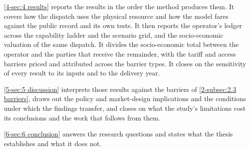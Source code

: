 \autoref{4-sec:4 results} reports the results in the order the method produces them. It covers how the dispatch uses the physical resource and how the model fares against the public record and its own tests. It then reports the operator's ledger across the capability ladder and the scenario grid, and the socio-economic valuation of the same dispatch. It divides the socio-economic total between the operator and the parties that receive the remainder, with the tariff and access barriers priced and attributed across the barrier types. It closes on the sensitivity of every result to its inputs and to the delivery year.

\autoref{5-sec:5 discussion} interprets those results against the barriers of \autoref{2-subsec:2.3 barriers}, draws out the policy and market-design implications and the conditions under which the findings transfer, and closes on what the study's limitations cost its conclusions and the work that follows from them.

\autoref{6-sec:6 conclusion} answers the research questions and states what the thesis establishes and what it does not.

\newpage